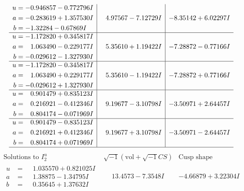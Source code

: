 \documentclass[1p]{elsarticle_modified}
\theoremstyle{definition}
\newcommand{\I}{\sqrt{-1}}
\begin{document}
$$\begin{array}{c|c|c}
\begin{aligned}
u &= -0.946857 - 0.772796 I \\
a &= -0.283619 + 1.357530 I \\
b &= -1.32284 - 0.67869 I\end{aligned}
 & \phantom{-}4.97567 - 7.12729 I & -8.35142 + 6.02297 I \\ \hline\begin{aligned}
u &= -1.172820 + 0.345817 I \\
a &= \phantom{-}1.063490 - 0.229177 I \\
b &= -0.029612 - 1.327930 I\end{aligned}
 & \phantom{-}5.35610 + 1.19422 I & -7.28872 - 0.77166 I \\ \hline\begin{aligned}
u &= -1.172820 - 0.345817 I \\
a &= \phantom{-}1.063490 + 0.229177 I \\
b &= -0.029612 + 1.327930 I\end{aligned}
 & \phantom{-}5.35610 - 1.19422 I & -7.28872 + 0.77166 I \\ \hline\begin{aligned}
u &= \phantom{-}0.901479 + 0.835123 I \\
a &= \phantom{-}0.216921 - 0.412346 I \\
b &= \phantom{-}0.804174 - 0.071969 I\end{aligned}
 & \phantom{-}9.19677 - 3.10798 I & -3.50971 + 2.64457 I \\ \hline\begin{aligned}
u &= \phantom{-}0.901479 - 0.835123 I \\
a &= \phantom{-}0.216921 + 0.412346 I \\
b &= \phantom{-}0.804174 + 0.071969 I\end{aligned}
 & \phantom{-}9.19677 + 3.10798 I & -3.50971 - 2.64457 I\\
 \hline 
 \end{array}$$\newpage$$\begin{array}{c|c|c}  
\text{Solutions to }I^u_{2}& \I (\text{vol} + \sqrt{-1}CS) & \text{Cusp shape}\\
 \hline 
\begin{aligned}
u &= \phantom{-}1.035570 + 0.821025 I \\
a &= \phantom{-}1.38875 - 1.34795 I \\
b &= \phantom{-}0.35645 + 1.37632 I\end{aligned}
 & \phantom{-}13.4573 - 7.3548 I & -4.66879 + 3.22304 I \\ \hline\begin{aligned}

\end{aligned}
\end{array}$$
\end{document}
